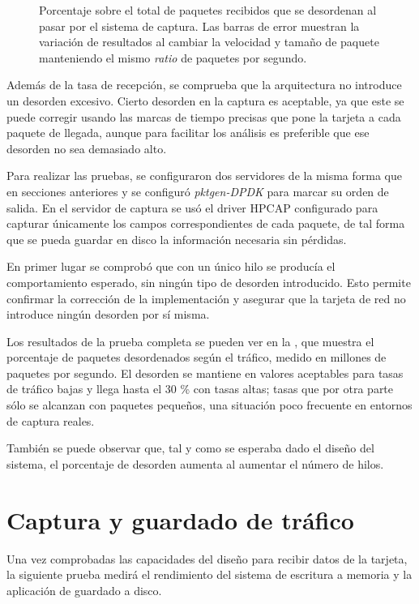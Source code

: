 \documentclass[twoside, 12pt]{epstfg}
\begin{document}
\begin{figure}[hbtp]
\caption[Desorden de paquetes inducido por el sistema de captura]{Porcentaje sobre el total de paquetes recibidos que se desordenan al pasar por el sistema de captura. Las barras de error muestran la variación de resultados al cambiar la velocidad y tamaño de paquete manteniendo el mismo \textit{ratio} de paquetes por segundo.}
\label{fig:Validacion:Ordering}
\end{figure}

Además de la tasa de recepción, se comprueba que la arquitectura no introduce un desorden excesivo. Cierto desorden en la captura es aceptable, ya que este se puede corregir usando las marcas de tiempo precisas que pone la tarjeta a cada paquete de llegada, aunque para facilitar los análisis es preferible que ese desorden no sea demasiado alto.

Para realizar las pruebas, se configuraron dos servidores de la misma forma que en secciones anteriores y se configuró \textit{pktgen-DPDK} para marcar su orden de salida. En el servidor de captura se usó el driver HPCAP configurado para capturar únicamente los campos correspondientes de cada paquete, de tal forma que se pueda guardar en disco la información necesaria sin pérdidas.

En primer lugar se comprobó que con un único hilo se producía el comportamiento esperado, sin ningún tipo de desorden introducido. Esto permite confirmar la corrección de la implementación y asegurar que la tarjeta de red no introduce ningún desorden por sí misma.

Los resultados de la prueba completa se pueden ver en la , que muestra el porcentaje de paquetes desordenados según el tráfico, medido en millones de paquetes por segundo. El desorden se mantiene en valores aceptables para tasas de tráfico bajas y llega hasta el 30 \% con tasas altas; tasas que por otra parte sólo se alcanzan con paquetes pequeños, una situación poco frecuente en entornos de captura reales.

También se puede observar que, tal y como se esperaba dado el diseño del sistema, el porcentaje de desorden aumenta al aumentar el número de hilos.

\section{Captura y guardado de tráfico}

Una vez comprobadas las capacidades del diseño para recibir datos de la tarjeta, la siguiente prueba medirá el rendimiento del sistema de escritura a memoria y la aplicación de guardado a disco.
\end{document}
